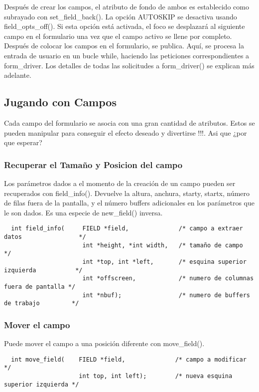 \documentclass{article}
\begin{document}
Después de crear los campos, el atributo de fondo de ambos es establecido como
subrayado con set\_field\_back(). La opción AUTOSKIP se desactiva usando
field\_opts\_off(). Si esta opción está activada, el foco se desplazará al
siguiente campo en el formulario una vez que el campo activo se llene por
completo.\\

Después de colocar los campos en el formulario, se publica. Aquí, se procesa la
entrada de usuario en un bucle while, haciendo las peticiones correspondientes
a form\_driver. Los detalles de todas las solicitudes a form\_driver() se
explican más adelante.

\subsection{Jugando con Campos}%
Cada campo del formulario se asocia con una gran cantidad de atributos. Estos
se pueden manipular para conseguir el efecto deseado y divertirse !!!. Asi que
¿por que esperar?

\subsubsection{Recuperar el Tamaño y Posicion del campo}%
Los parámetros dados a el momento de la creación de un campo pueden ser
recuperados con field\_info(). Devuelve la altura, anchura, starty, startx,
número de filas fuera de la pantalla, y el número buffers adicionales en los
parámetros que le son dados. Es una especie de new\_field() inversa.

\begin{verbatim}
  int field_info(     FIELD *field,              /* campo a extraer datos                */
                      int *height, *int width,   /* tamaño de campo                      */
                      int *top, int *left,       /* esquina superior izquierda           */
                      int *offscreen,            /* numero de columnas fuera de pantalla */
                      int *nbuf);                /* numero de buffers de trabajo         */
\end{verbatim}

\subsubsection{Mover el campo}%
Puede mover el campo a una posición diferente con move\_field().

\begin{verbatim}
  int move_field(    FIELD *field,              /* campo a modificar                */
                     int top, int left);        /* nueva esquina superior izquierda */
\end{verbatim}
\end{document}
